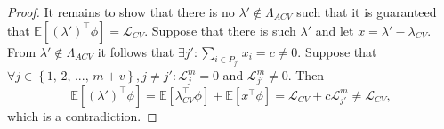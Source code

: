\documentclass[11pt,dvipsnames]{article}
\newtheorem{proof}{Proof of Proposition}
\begin{document}
\begin{appendices}
\begin{proof}
It remains to show that there is no $ \lambda' \notin \Lambda_{ACV}  $ such that it is guaranteed that $ \mathbb{E}[\left( \lambda'\right) ^{\top} \phi]=\mathcal{L}_{CV}  $. Suppose that there is such $ \lambda'  $ and let $ x=\lambda' - \lambda_{CV} $. From $ \lambda' \notin \Lambda_{ACV}  $ it follows that $ \exists j': \sum_{i \in P_{j'}} x_{i} = c \neq 0 $. Suppose that $ \forall j \in \left\lbrace 1,\,2,\,...,\,m+v\right\rbrace, j \neq j': \mathcal{L}_{j}^{m}=0 $ and $  \mathcal{L}_{j'}^{m}\neq 0 $. Then 
\begin{equation}
\mathbb{E}[\left( \lambda'\right) ^{\top} \phi]=\mathbb{E}[\lambda_{CV}^{\top} \phi]+ \mathbb{E}[x^{\top} \phi]=\mathcal{L}_{CV}+c\mathcal{L}_{j'}^{m} \neq \mathcal{L}_{CV},
\end{equation}
which is a contradiction.
\end{proof}




\end{appendices}
\end{document}
